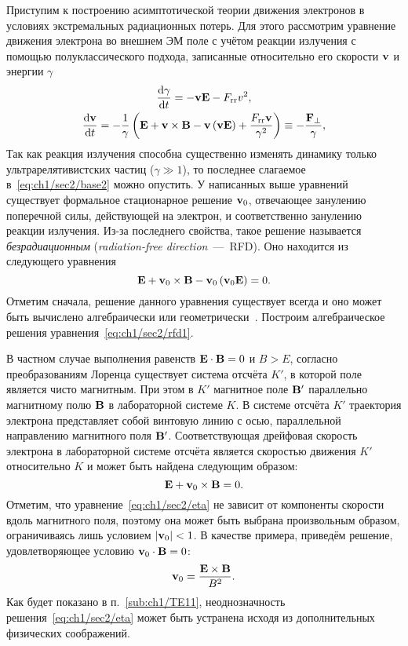 Приступим к построению асимптотической теории движения электронов в условиях экстремальных радиационных потерь.
Для этого рассмотрим уравнение движения электрона во внешнем ЭМ поле с учётом реакции излучения с помощью полуклассического подхода, записанные относительно его скорости $\vb{v}$ и энергии $\gamma$
\begin{gather}
    \label{eq:ch1/sec2/base1}
    \dv{\gamma}{t} = -\vb{vE} - F_\mathrm{rr} v^2 , \\
    \label{eq:ch1/sec2/base2}
    \dv{\vb{v}}{t} = - \frac{1}{\gamma}\left( \vb{E + v\times B - v\left( vE \right)} + \frac{F_\mathrm{rr}\vb{v}}{\gamma^2} \right) \equiv -\frac{\vb{F}_\perp}{\gamma} ,
\end{gather}
Так как реакция излучения способна существенно изменять динамику только ультрарелятивистских частиц ($\gamma \gg 1$), то последнее слагаемое в~\eqref{eq:ch1/sec2/base2} можно опустить.
У написанных выше уравнений существует формальное стационарное решение $\vb{v}_0$, отвечающее занулению поперечной силы, действующей на электрон, и соответственно занулению реакции излучения.
Из-за последнего свойства, такое решение называется \textit{безрадиационным} (\textit{radiation-free direction}~---~RFD).
Оно находится из следующего уравнения
\begin{equation}
    \label{eq:ch1/sec2/rfd1}
    \vb{E} + \vb{v}_0\times \vb{B} - \vb{v}_0\left( \vb{v}_0\vb{E} \right) = 0 .
\end{equation}
Отметим сначала, решение данного уравнения существует всегда и оно может быть вычислено алгебраически или геометрически~\cite{gonoskov2018radiation}.
Построим алгебраическое решения уравнения~\eqref{eq:ch1/sec2/rfd1}.

В частном случае выполнения равенств $\vb{E}\cdot\vb{B} = 0$ и $B > E$, согласно преобразованиям Лоренца существует система отсчёта $K'$, в которой поле является чисто магнитным. 
При этом в $K'$ магнитное поле $\vb{B}'$ параллельно магнитному полю $\vb{B}$ в лабораторной системе $K$. 
В системе отсчёта $K'$ траектория электрона представляет собой винтовую линию с осью, параллельной направлению магнитного поля $\vb{B}'$.
Соответствующая дрейфовая скорость электрона в лабораторной системе отсчёта является скоростью движения $K'$ относительно $K$ и может быть найдена следующим образом:
\begin{equation}
    \label{eq:ch1/sec2/eta}
    \vb{E} + \vb{v}_0 \times \vb{B} = 0.
\end{equation}
Отметим, что уравнение~\eqref{eq:ch1/sec2/eta} не зависит от компоненты скорости вдоль магнитного поля, поэтому она может быть выбрана произвольным образом, ограничиваясь лишь условием $|\vb{v}_0| < 1$.
В качестве примера, приведём решение, удовлетворяющее условию $\vb{v}_0 \cdot \vb{B} = 0$:
\begin{equation}
\label{eq:ch1/sec2/eta_explicit}
    \vb{v}_0 = \frac{\vb{E} \times \vb{B}}{B^2}.
\end{equation}
Как будет показано в п.~\ref{sub:ch1/TE11}, неоднозначность решения~\eqref{eq:ch1/sec2/eta} может быть устранена исходя из дополнительных физических соображений.

